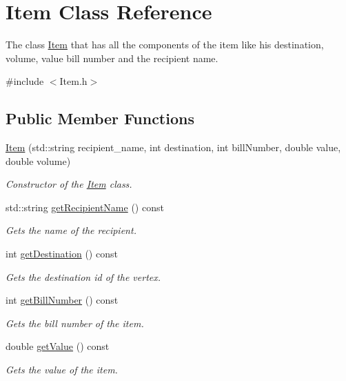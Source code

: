 \hypertarget{class_item}{}\section{Item Class Reference}
\label{class_item}


The class \hyperlink{class_item}{Item} that has all the components of the item like his destination, volume, value bill number and the recipient name.  




{\ttfamily \#include $<$Item.\+h$>$}

\subsection*{Public Member Functions}
\begin{DoxyCompactItemize}
\item 
\hyperlink{class_item_a8184b8c874e451812dd25a90d7ee2d93}{Item} (std\+::string recipient\+\_\+name, int destination, int bill\+Number, double value, double volume)
\begin{DoxyCompactList}\small\item\em Constructor of the \hyperlink{class_item}{Item} class. \end{DoxyCompactList}\item 
std\+::string \hyperlink{class_item_a1bab17828f1e194978b6f409cb72ebfc}{get\+Recipient\+Name} () const 
\begin{DoxyCompactList}\small\item\em Gets the name of the recipient. \end{DoxyCompactList}\item 
int \hyperlink{class_item_a3fc6e85c541f8447fbf4e58ef85b01f9}{get\+Destination} () const 
\begin{DoxyCompactList}\small\item\em Gets the destination id of the vertex. \end{DoxyCompactList}\item 
int \hyperlink{class_item_a1b107acd1943c433d6f510327428d04b}{get\+Bill\+Number} () const 
\begin{DoxyCompactList}\small\item\em Gets the bill number of the item. \end{DoxyCompactList}\item 
double \hyperlink{class_item_a7ff3b6e646fd7b0b12c4fdf6fb60842f}{get\+Value} () const 
\begin{DoxyCompactList}\small\item\em Gets the value of the item. \end{DoxyCompactList}\item 

\end{DoxyCompactItemize}
